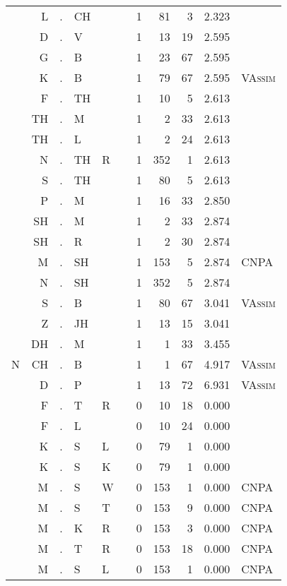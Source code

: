 \begin{longtable}{r@{ } r@{ } c@{ } l@{ } l@{ } l@{ } r r r r l }
  & L & . & CH &   &   & 1 & 81 & 3 & 2.323 &  \\
  & D & . & V &   &   & 1 & 13 & 19 & 2.595 &  \\
  & G & . & B &   &   & 1 & 23 & 67 & 2.595 &  \\
  & K & . & B &   &   & 1 & 79 & 67 & 2.595 & \textsc{VAssim} \\
  & F & . & TH &   &   & 1 & 10 & 5 & 2.613 &  \\
  & TH & . & M &   &   & 1 & 2 & 33 & 2.613 &  \\
  & TH & . & L &   &   & 1 & 2 & 24 & 2.613 &  \\
  & N & . & TH & R &   & 1 & 352 & 1 & 2.613 &  \\
  & S & . & TH &   &   & 1 & 80 & 5 & 2.613 &  \\
  & P & . & M &   &   & 1 & 16 & 33 & 2.850 &  \\
  & SH & . & M &   &   & 1 & 2 & 33 & 2.874 &  \\
  & SH & . & R &   &   & 1 & 2 & 30 & 2.874 &  \\
  & M & . & SH &   &   & 1 & 153 & 5 & 2.874 & \textsc{CNPA} \\
  & N & . & SH &   &   & 1 & 352 & 5 & 2.874 &  \\
  & S & . & B &   &   & 1 & 80 & 67 & 3.041 & \textsc{VAssim} \\
  & Z & . & JH &   &   & 1 & 13 & 15 & 3.041 &  \\
  & DH & . & M &   &   & 1 & 1 & 33 & 3.455 &  \\
N & CH & . & B &   &   & 1 & 1 & 67 & 4.917 & \textsc{VAssim} \\
  & D & . & P &   &   & 1 & 13 & 72 & 6.931 & \textsc{VAssim} \\
  & F & . & T & R &   & 0 & 10 & 18 & 0.000 &  \\
  & F & . & L &   &   & 0 & 10 & 24 & 0.000 &  \\
  & K & . & S & L &   & 0 & 79 & 1 & 0.000 &  \\
  & K & . & S & K &   & 0 & 79 & 1 & 0.000 &  \\
  & M & . & S & W &   & 0 & 153 & 1 & 0.000 & \textsc{CNPA} \\
  & M & . & S & T &   & 0 & 153 & 9 & 0.000 & \textsc{CNPA} \\
  & M & . & K & R &   & 0 & 153 & 3 & 0.000 & \textsc{CNPA} \\
  & M & . & T & R &   & 0 & 153 & 18 & 0.000 & \textsc{CNPA} \\
  & M & . & S & L &   & 0 & 153 & 1 & 0.000 & \textsc{CNPA} \\

\end{longtable}
